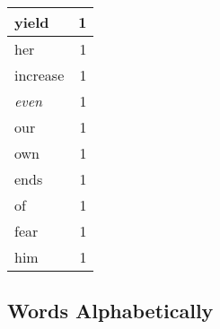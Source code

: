 \begin{center}
\begin{longtable}{l|r}
yield & 1 \\ \hline
her & 1 \\ \hline
increase & 1 \\ \hline
\emph{even} & 1 \\ \hline
our & 1 \\ \hline
own & 1 \\ \hline
ends & 1 \\ \hline
of & 1 \\ \hline
fear & 1 \\ \hline
him & 1 \\ \hline
\end{longtable}
\end{center}



\normalsize



\subsection{Words Alphabetically}

